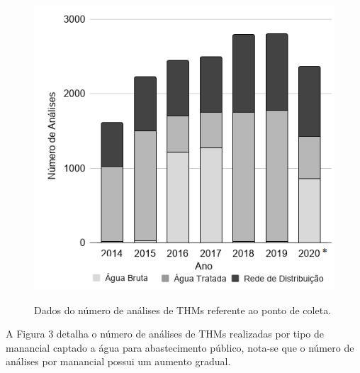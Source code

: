 \begin{figure}[!htb]
\centering
\caption{\small Dados do número de análises de THMs referente ao ponto de coleta.}
\includegraphics[scale=0.8]{imagens/analise THMs ponto de coleta.png}
\label{fig03}
\end{figure}

A Figura 3 detalha o número de análises de THMs realizadas por tipo de manancial captado a água para abastecimento público, nota-se que o número de análises por manancial possui um aumento gradual.


